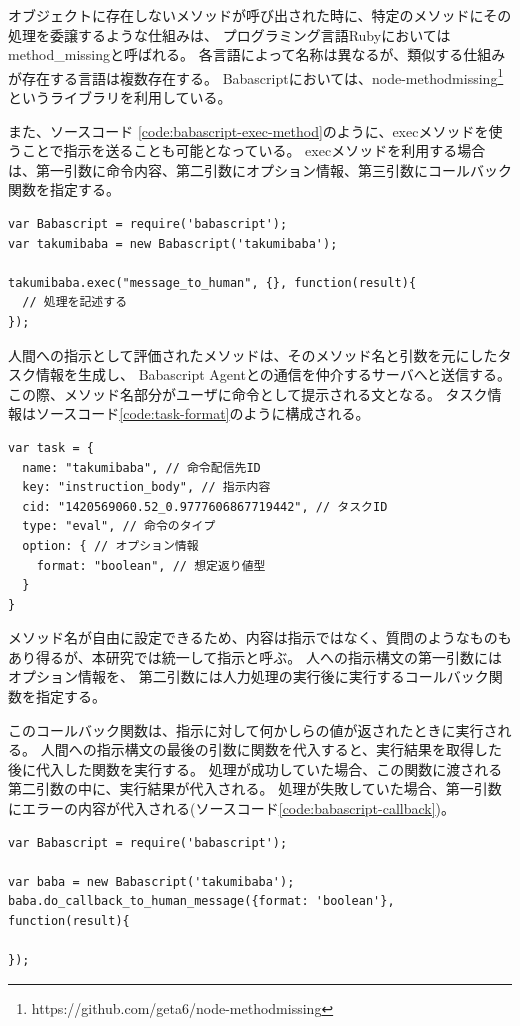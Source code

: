 オブジェクトに存在しないメソッドが呼び出された時に、特定のメソッドにその処理を委譲するような仕組みは、
プログラミング言語Rubyにおいてはmethod\_missingと呼ばれる。
各言語によって名称は異なるが、類似する仕組みが存在する言語は複数存在する。
Babascriptにおいては、node-methodmissing\footnote{https://github.com/geta6/node-methodmissing}というライブラリを利用している。

また、ソースコード
\ref{code:babascript-exec-method}のように、execメソッドを使うことで指示を送ることも可能となっている。
execメソッドを利用する場合は、第一引数に命令内容、第二引数にオプション情報、第三引数にコールバック関数を指定する。

\begin{lstlisting}[caption=execメソッドによる指示構文, label=code:babascript-exec-method]
var Babascript = require('babascript');
var takumibaba = new Babascript('takumibaba');

takumibaba.exec("message_to_human", {}, function(result){
  // 処理を記述する
});
\end{lstlisting}

人間への指示として評価されたメソッドは、そのメソッド名と引数を元にしたタスク情報を生成し、
Babascript Agentとの通信を仲介するサーバへと送信する。
この際、メソッド名部分がユーザに命令として提示される文となる。
タスク情報はソースコード\ref{code:task-format}のように構成される。

\begin{lstlisting}[caption=タスク情報の例, label=code:task-format]
var task = {
  name: "takumibaba", // 命令配信先ID
  key: "instruction_body", // 指示内容
  cid: "1420569060.52_0.9777606867719442", // タスクID
  type: "eval", // 命令のタイプ
  option: { // オプション情報
    format: "boolean", // 想定返り値型
  }
}
\end{lstlisting}

メソッド名が自由に設定できるため、内容は指示ではなく、質問のようなものもあり得るが、本研究では統一して指示と呼ぶ。
人への指示構文の第一引数にはオプション情報を、
第二引数には人力処理の実行後に実行するコールバック関数を指定する。

このコールバック関数は、指示に対して何かしらの値が返されたときに実行される。
人間への指示構文の最後の引数に関数を代入すると、実行結果を取得した後に代入した関数を実行する。
処理が成功していた場合、この関数に渡される第二引数の中に、実行結果が代入される。
処理が失敗していた場合、第一引数にエラーの内容が代入される(ソースコード\ref{code:babascript-callback})。

\begin{lstlisting}[caption=コールバック関数の指定, label=code:babascript-callback]
var Babascript = require('babascript');

var baba = new Babascript('takumibaba');
baba.do_callback_to_human_message({format: 'boolean'}, function(result){

});
\end{lstlisting}


